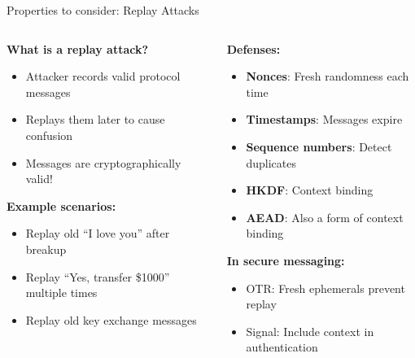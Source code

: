 \documentclass[aspectratio=169, lualatex, handout]{beamer}
\begin{document}
\begin{frame}{Properties to consider: Replay Attacks}
	\begin{columns}
		\begin{column}{0.5\textwidth}
			\textbf{What is a replay attack?}
			\begin{itemize}
				\item Attacker records valid protocol messages
				\item Replays them later to cause confusion
				\item Messages are cryptographically valid!
			\end{itemize}
			\textbf{Example scenarios:}
			\begin{itemize}
				\item Replay old ``I love you'' after breakup
				\item Replay ``Yes, transfer \$1000'' multiple times
				\item Replay old key exchange messages
			\end{itemize}
		\end{column}
		\begin{column}{0.5\textwidth}
			\textbf{Defenses:}
			\begin{itemize}
				\item \textbf{Nonces}: Fresh randomness each time
				\item \textbf{Timestamps}: Messages expire
				\item \textbf{Sequence numbers}: Detect duplicates
				\item \textbf{HKDF}: Context binding
				\item \textbf{AEAD}: Also a form of context binding
			\end{itemize}
			\textbf{In secure messaging:}
			\begin{itemize}
				\item OTR: Fresh ephemerals prevent replay
				\item Signal: Include context in authentication
			\end{itemize}
		\end{column}
	\end{columns}
\end{frame}
\end{document}
